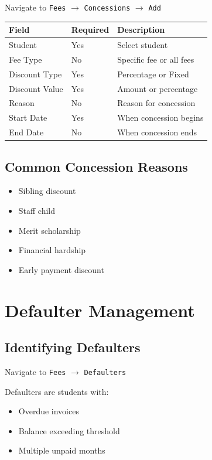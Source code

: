 \documentclass[12pt,a4paper]{report}
\begin{document}
Navigate to \texttt{Fees} $\rightarrow$ \texttt{Concessions} $\rightarrow$ \texttt{Add}

\begin{longtable}{@{}p{4cm}p{3cm}p{6cm}@{}}
\toprule
\textbf{Field} & \textbf{Required} & \textbf{Description} \\
\midrule
\endhead
Student & Yes & Select student \\
Fee Type & No & Specific fee or all fees \\
Discount Type & Yes & Percentage or Fixed \\
Discount Value & Yes & Amount or percentage \\
Reason & No & Reason for concession \\
Start Date & Yes & When concession begins \\
End Date & No & When concession ends \\
\bottomrule
\end{longtable}

\section{Common Concession Reasons}

\begin{itemize}[leftmargin=*]
    \item Sibling discount
    \item Staff child
    \item Merit scholarship
    \item Financial hardship
    \item Early payment discount
\end{itemize}

\chapter{Defaulter Management}

\section{Identifying Defaulters}

Navigate to \texttt{Fees} $\rightarrow$ \texttt{Defaulters}

Defaulters are students with:
\begin{itemize}[leftmargin=*]
    \item Overdue invoices
    \item Balance exceeding threshold
    \item Multiple unpaid months
\end{itemize}
\end{document}
